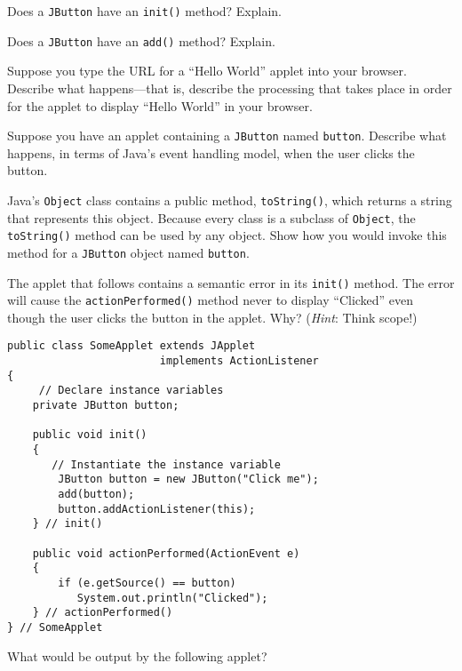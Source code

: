 \begin{EXRtwo}
\item  Does a {\tt JButton} have an {\tt init()} method? Explain.

\item  Does a {\tt JButton} have an {\tt add()} method? Explain.

\item  Suppose you type the URL for a ``Hello World'' applet
into your browser.  Describe what happens---that is, describe the
processing that takes place in order for the applet to display ``Hello
World'' in your browser.

\item  Suppose you have an applet containing a {\tt JButton}
named {\tt button}. Describe what happens, in terms of
Java's event handling model, when the user clicks  the
button.

\item  Java's {\tt Object} class contains a public method, {\tt toString()},
which returns a string that represents this object.  Because every class
is a subclass of {\tt Object}, the {\tt toString()} method can be used
by any object.   Show how you would invoke this method for a {\tt JButton}
object named {\tt button}.

\item  The  applet that follows contains a semantic error in
its {\tt init()} method.  The error will cause the
{\tt actionPerformed()} method never to display ``Clicked''
even though the user clicks the button in the
applet.  Why?  ({\it Hint}: Think scope!)

\begin{jjjlisting}
\begin{lstlisting}
public class SomeApplet extends JApplet 
                        implements ActionListener
{
     // Declare instance variables
    private JButton button;

    public void init()
    {   
       // Instantiate the instance variable
        JButton button = new JButton("Click me");
        add(button);
        button.addActionListener(this);
    } // init()

    public void actionPerformed(ActionEvent e)
    {
        if (e.getSource() == button)
           System.out.println("Clicked");
    } // actionPerformed()
} // SomeApplet
\end{lstlisting}
\end{jjjlisting}

\item  What would be output by the following applet?


\end{EXRtwo}
